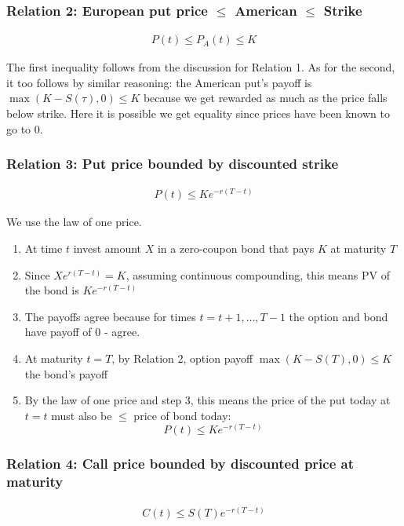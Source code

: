\documentclass[9pt]{extarticle}
\begin{document}
\subsubsection{Relation 2: European put price $\leq$ American $\leq$ Strike}

\begin{align}
  P(t) \leq P_A(t) \leq K
\end{align}

The first inequality follows from the discussion for Relation 1. As for the second, it too follows by similar reasoning: 
the American put's payoff is $\operatorname{max}(K-S(\tau),0)\leq K$ because we get rewarded as much as the price 
falls below strike. Here it is possible we get equality since prices have been known to go to 0.


\subsubsection{Relation 3: Put price bounded by discounted strike}

\begin{align}
  P(t) \leq Ke^{-r(T-t)}
\end{align}

We use the law of one price.
\begin{enumerate}
  \item At time $t$ invest amount $X$ in a zero-coupon bond that pays $K$ at maturity $T$
  \item Since $Xe^{r(T-t)} = K$, assuming continuous compounding, this means PV of the bond is $Ke^{-r(T-t)}$
  \item The payoffs agree because for times $t=t+1,\ldots,T-1$ the option and bond have payoff of 0 - agree.
  \item At maturity $t=T$, by Relation 2, option payoff $\operatorname{max}(K-S(T),0)\leq K$ the bond's payoff 
  \item By the law of one price and step 3, this means the price of the put today at $t=t$ must also be $\leq$ price of 
  bond today:
  $$P(t) \leq Ke^{-r(T-t)} $$   
\end{enumerate}

\subsubsection{Relation 4: Call price bounded by discounted price at maturity}

\begin{align}
  C(t) \leq S(T)e^{-r(T-t)}
\end{align}
\end{document}
